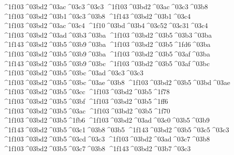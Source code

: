 {	^^^^1f103^^^^03bd2^^^^03ac^^^^03c3^^^^03c3
	^^^^1f103^^^^03bd2^^^^03ac^^^^03c3^^^^03b8
	^^^^1f103^^^^03bd2^^^^03b1^^^^03c3^^^^03b8
	^^^^1f143^^^^03bd2^^^^03b1^^^^03c4   		%
	^^^^1f103^^^^03bd2^^^^03ac^^^^03c4
^^^^1f10^^^^03bd^^^^03b4^^^^03c52^^^^03c31^^^^03c4   		%
	^^^^1f103^^^^03bd2^^^^03ad^^^^03b3^^^^03ba   		%
	^^^^1f103^^^^03bd2^^^^03b5^^^^03b3^^^^03ba    		%
	^^^^1f143^^^^03bd2^^^^03b5^^^^03b9^^^^03ba   		%
	^^^^1f103^^^^03bd2^^^^03b5^^^^1fd6^^^^03ba   		%
	^^^^1f103^^^^03bd2^^^^03b5^^^^03b9^^^^03ba    		%
	^^^^1f103^^^^03bd2^^^^03b5^^^^03af^^^^03ba   		%
	^^^^1f143^^^^03bd2^^^^03b5^^^^03b9^^^^03bc   		%
	^^^^1f103^^^^03bd2^^^^03b5^^^^03af^^^^03bc
	^^^^1f103^^^^03bd2^^^^03b5^^^^03bc^^^^03ad^^^^03c3^^^^03c3 		%
	^^^^1f103^^^^03bd2^^^^03b5^^^^03bc^^^^03ae^^^^03b8  		%
	^^^^1f103^^^^03bd2^^^^03b5^^^^03bd^^^^03ae   		%
	^^^^1f103^^^^03bd2^^^^03b5^^^^03cc    		%
	^^^^1f103^^^^03bd2^^^^03b5^^^^1f78
	^^^^1f103^^^^03bd2^^^^03b5^^^^03bf
	^^^^1f103^^^^03bd2^^^^03b5^^^^1ff6
	^^^^1f103^^^^03bd2^^^^03b5^^^^03ac
	^^^^1f103^^^^03bd2^^^^03b5^^^^1f70
	^^^^1f103^^^^03bd2^^^^03b5^^^^1fb6 
	^^^^1f103^^^^03bd2^^^^03ad^^^^03c0^^^^03b5^^^^03b9
	^^^^1f143^^^^03bd2^^^^03b5^^^^03c1^^^^03b8^^^^03b5  		%
	^^^^1f143^^^^03bd2^^^^03b5^^^^03c5^^^^03c3   		%
	^^^^1f103^^^^03bd2^^^^03b5^^^^03cd^^^^03c3   		%
	^^^^1f103^^^^03bd2^^^^03ad^^^^03c7^^^^03b8   		%
	^^^^1f103^^^^03bd2^^^^03b5^^^^03c7^^^^03b8
	^^^^1f143^^^^03bd2^^^^03b7^^^^03c3		%
}
